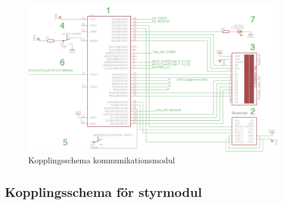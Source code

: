 \documentclass[a4paper,12pt,fleqn]{article}
\begin{document}
\begin{figure}[ht] %
  \begin{center}
  \includegraphics[keepaspectratio=true,width=\linewidth]{bilder/Kom_uptodate.png}  %
  \end{center}
  \caption{Kopplingsschema kommunikationsmodul} %
  \label{fig:kopplingkom} %
\end{figure}
 \clearpage %
 

\subsection*{Kopplingsschema för styrmodul}
\end{document}
